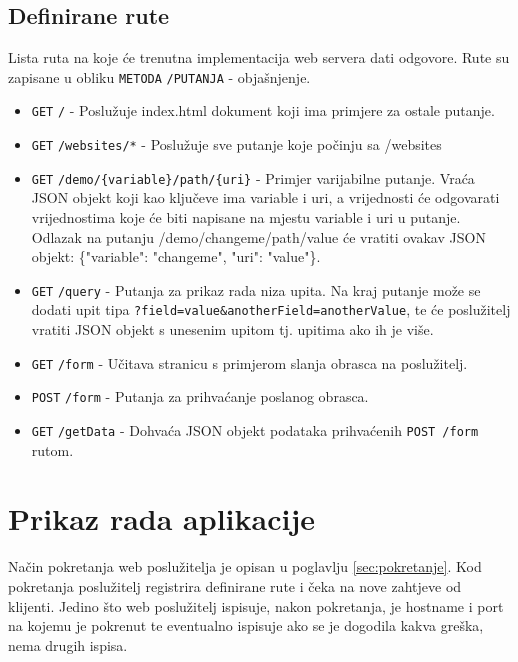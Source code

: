 \documentclass[]{foi} %
\begin{document}
\subsection{Definirane rute} \label{sec:rute}

Lista ruta na koje će trenutna implementacija web servera dati odgovore.
Rute su zapisane u obliku \texttt{METODA} \texttt{/PUTANJA} - objašnjenje.
\begin{itemize}
	\item \texttt{GET} \texttt{/} - Poslužuje index.html dokument koji ima primjere
	      za ostale putanje.
	\item \texttt{GET} \texttt{/websites/*} - Poslužuje sve putanje koje počinju sa /websites
	\item \texttt{GET} \texttt{/demo/\{variable\}/path/\{uri\}} - Primjer varijabilne putanje.
	      Vraća JSON objekt koji kao ključeve ima variable i uri, a vrijednosti će odgovarati
	      vrijednostima koje će biti napisane na mjestu variable i uri u putanje. Odlazak na
	      putanju /demo/changeme/path/value će vratiti ovakav JSON objekt: \{"variable": "changeme", "uri": "value"\}.
	\item \texttt{GET} \texttt{/query} - Putanja za prikaz rada niza upita. Na kraj putanje može
	      se dodati upit tipa \texttt{?field=value\&anotherField=anotherValue}, te će poslužitelj
	      vratiti JSON objekt s unesenim upitom tj. upitima ako ih je više.
	\item \texttt{GET} \texttt{/form} - Učitava stranicu s primjerom slanja obrasca na poslužitelj.
	\item \texttt{POST} \texttt{/form} - Putanja za prihvaćanje poslanog obrasca.
    \item \texttt{GET} \texttt{/getData} - Dohvaća JSON objekt podataka prihvaćenih \texttt{POST /form} rutom.
\end{itemize}

\section{Prikaz rada aplikacije}

Način pokretanja web poslužitelja je opisan u poglavlju \ref{sec:pokretanje}. Kod pokretanja
poslužitelj registrira definirane rute i čeka na nove zahtjeve od klijenti. Jedino što
web poslužitelj ispisuje, nakon pokretanja, je hostname i port na kojemu je pokrenut te
eventualno ispisuje ako se je dogodila kakva greška, nema drugih ispisa.
\end{document}

